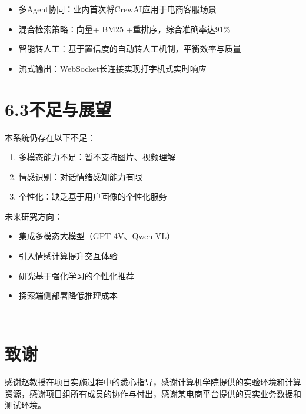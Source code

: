 \documentclass{harryopo-report}
\begin{document}
\begin{itemize}
  \item {\fzht 多Agent协同}：业内首次将CrewAI应用于电商客服场景
  \item {\fzht 混合检索策略}：向量+ BM25 +重排序，综合准确率达91\%
  \item {\fzht 智能转人工}：基于置信度的自动转人工机制，平衡效率与质量
  \item {\fzht 流式输出}：WebSocket长连接实现打字机式实时响应
\end{itemize}

\section*{6.3不足与展望}

本系统仍存在以下不足：

\begin{enumerate}
  \item {\fzht 多模态能力不足}：暂不支持图片、视频理解
  \item {\fzht 情感识别}：对话情绪感知能力有限
  \item {\fzht 个性化}：缺乏基于用户画像的个性化服务
\end{enumerate}

未来研究方向：

\begin{itemize}
  \item 集成多模态大模型（GPT-4V、Qwen-VL）
  \item 引入情感计算提升交互体验
  \item 研究基于强化学习的个性化推荐
  \item 探索端侧部署降低推理成本
\end{itemize}

\medskip\hrule\medskip

\medskip\hrule\medskip

\section*{致谢}

感谢赵教授在项目实施过程中的悉心指导，感谢计算机学院提供的实验环境和计算资源，感谢项目组所有成员的协作与付出，感谢某电商平台提供的真实业务数据和测试环境。
\end{document}
